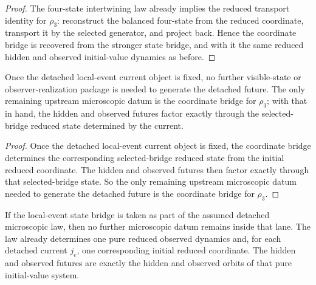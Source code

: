 \begin{proof}
The four-state intertwining law already implies the reduced transport identity
for \(\rho_3\): reconstruct the balanced four-state from the reduced
coordinate, transport it by the selected generator, and project back. Hence
the coordinate bridge is recovered from the stronger state bridge, and with it
the same reduced hidden and observed initial-value dynamics as before.
\end{proof}

\begin{corollary}
\label{cor:the-local-event-current-object-needs-only-the-coordinate-bridge-to-generate-the-detached-future}
Once the detached local-event current object is fixed, no further visible-state
or observer-realization package is needed to generate the detached future. The
only remaining upstream microscopic datum is the coordinate bridge for
\(\rho_3\); with that in hand, the hidden and observed futures factor exactly
through the selected-bridge reduced state determined by the current.
\end{corollary}

\begin{proof}
Once the detached local-event current object is fixed, the coordinate bridge
determines the corresponding selected-bridge reduced state from the initial
reduced coordinate. The hidden and observed futures then factor exactly
through that selected-bridge state. So the only remaining upstream microscopic
datum needed to generate the detached future is the coordinate bridge for
\(\rho_3\).
\end{proof}

\begin{corollary}
\label{cor:the-sharpened-detached-microscopic-law-is-already-a-pure-reduced-initial-value-system}
If the local-event state bridge is taken as part of the assumed detached
microscopic law, then no further microscopic datum remains inside that lane.
The law
already determines one pure reduced observed dynamics and, for each detached
current \(j_e\), one corresponding initial reduced coordinate. The hidden and
observed futures are exactly the hidden and observed orbits of that pure
initial-value system.
\end{corollary}

